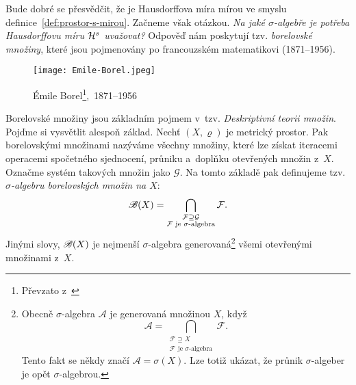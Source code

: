 Bude dobré se přesvědčit, že je Hausdorffova míra mírou ve smyslu definice~\ref{def:prostor-s-mirou}. Začneme však otázkou. \emph{Na jaké $\sigma$-algebře je potřeba Hausdorffovu míru $\mathcal{H}^{s}$ uvažovat?} Odpověď nám poskytují tzv. \emph{borelovské množiny}, které jsou pojmenovány po francouzském matematikovi  (1871--1956).
\begin{figure}[h]
    \centering
    \texttt{[image: Emile-Borel.jpeg]}
    \caption[Émile Borel,~1871--1956]{Émile Borel\footnote{Převzato z~\cite{OConnorBorel2025}},~1871--1956}
    \label{fig:emile-borel}
\end{figure}
Borelovské množiny jsou základním pojmem v~tzv. \emph{Deskriptivní teorii množin}. Pojďme si vysvětlit alespoň základ. Nechť $(X,\varrho)$ je metrický prostor. Pak borelovskými množinami nazýváme všechny množiny, které lze získat iteracemi operacemi spočetného sjednocení, průniku a~doplňku otevřených množin z~$X$. Označme systém takových množin jako $\mathcal{G}$. Na tomto základě pak definujeme tzv. \emph{$\sigma$-algebru borelovských množin na $X$}:
\[\mathscr{B}(X)=\bigcap_{\substack{\mathcal{F}\supseteq\mathcal{G}\\\text{$\mathcal{F}$ je $\sigma$-algebra}}}\mathcal{F}.\]
Jinými slovy, $\mathscr{B}(X)$ je nejmenší $\sigma$-algebra generovaná\footnote{Obecně $\sigma$-algebra $\mathcal{A}$ je generovaná množinou $X$, když
\[\mathcal{A}=\bigcap_{\substack{\mathcal{F}\supseteq X\\\text{$\mathcal{F}$ je $\sigma$-algebra}}}\mathcal{F}.\]
Tento fakt se někdy značí $\mathcal{A}=\sigma(X)$. Lze totiž ukázat, že průnik $\sigma$-algeber je opět $\sigma$-algebrou.} všemi otevřenými množinami z~$X$.

